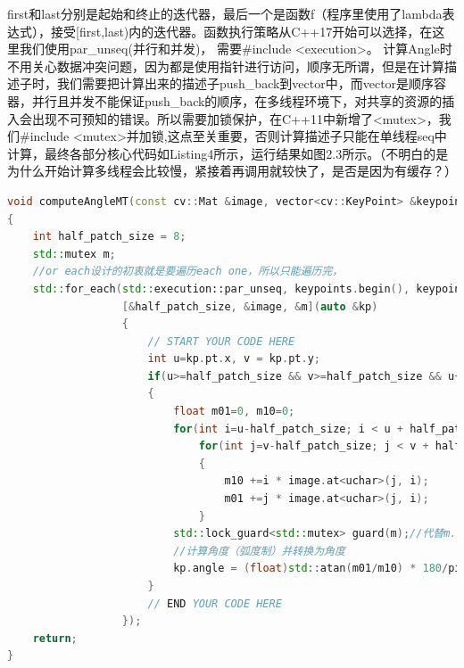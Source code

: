 \documentclass[40pt,a4paper，UTF8]{ctexart}
\numberwithin{equation}{section}
\begin{document}
first和last分别是起始和终止的迭代器，最后一个是函数f（程序里使用了lambda表达式），接受[first,last)内的迭代器。函数执行策略从C++17开始可以选择，在这里我们使用par\_unseq(并行和并发)，
需要\#include <execution>。
计算Angle时不用关心数据冲突问题，因为都是使用指针进行访问，顺序无所谓，但是在计算描述子时，我们需要把计算出来的描述子push\_back到vector中，而vector是顺序容器，并行且并发不能保证push\_back的顺序，在多线程环境下，对共享的资源的插入会出现不可预知的错误。所以需要加锁保护\cite{ref3}，在C++11中新增了<mutex>，我们\#include <mutex>并加锁\cite{ref4},这点至关重要，否则计算描述子只能在单线程seq中计算，最终各部分核心代码如Listing4所示，运行结果如图2.3所示。（不明白的是为什么开始计算多线程会比较慢，紧接着再调用就较快了，是否是因为有缓存？）
\begin{lstlisting}[language=C++, caption=computeORB.cpp]
void computeAngleMT(const cv::Mat &image, vector<cv::KeyPoint> &keypoints)
{
    int half_patch_size = 8;
    std::mutex m;
    //or each设计的初衷就是要遍历each one，所以只能遍历完，
    std::for_each(std::execution::par_unseq, keypoints.begin(), keypoints.end(),
                  [&half_patch_size, &image, &m](auto &kp)
                  {
                      // START YOUR CODE HERE
                      int u=kp.pt.x, v = kp.pt.y;
                      if(u>=half_patch_size && v>=half_patch_size && u+half_patch_size<=image.cols && v+half_patch_size<=image.rows)
                      {
                          float m01=0, m10=0;
                          for(int i=u-half_patch_size; i < u + half_patch_size; ++i)  //x方向遍历16个点(右)
                              for(int j=v-half_patch_size; j < v + half_patch_size; ++j)  //y方向遍历16个点(下)
                              {
                                  m10 +=i * image.at<uchar>(j, i);
                                  m01 +=j * image.at<uchar>(j, i);
                              }
                          std::lock_guard<std::mutex> guard(m);//代替m.lock; m.unlock();
                          //计算角度（弧度制）并转换为角度
                          kp.angle = (float)std::atan(m01/m10) * 180/pi ;  //或者std::atan2(m01, m10)*180/pi;
                      }
                      // END YOUR CODE HERE
                  });
    return;
}



\end{lstlisting}
\end{document}
